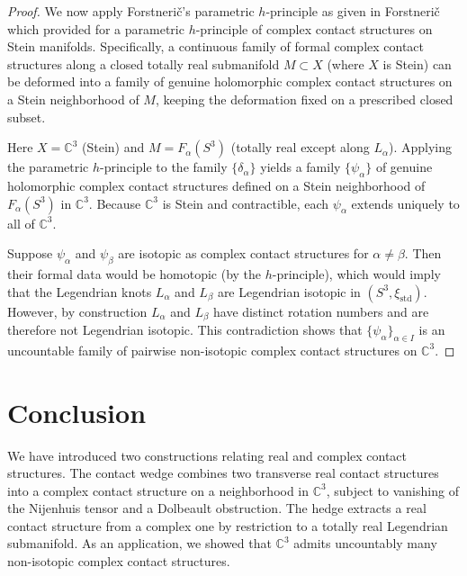 \documentclass{amsart}
\newcommand{\C}{\mathbb{C}}
\begin{document}
\begin{proof}
\medskip
We now apply Forstnerič's parametric $h$-principle as given in Forstnerič \cite{Forstneric2020} which provided for a parametric $h$-principle of complex contact structures on Stein manifolds. 
Specifically, a continuous family of formal complex contact structures along a closed totally real submanifold $M\subset X$ 
(where $X$ is Stein) can be deformed into a family of genuine holomorphic complex contact structures on a Stein neighborhood of $M$, 
keeping the deformation fixed on a prescribed closed subset.

Here $X=\mathbb{C}^3$ (Stein) and $M = F_\alpha(S^3)$ (totally real except along $L_\alpha$). 
Applying the parametric $h$-principle to the family $\{\delta_\alpha\}$ yields a family $\{\psi_\alpha\}$ of genuine holomorphic complex contact structures 
defined on a Stein neighborhood of $F_\alpha(S^3)$ in $\mathbb{C}^3$. 
Because $\mathbb{C}^3$ is Stein and contractible, each $\psi_\alpha$ extends uniquely to all of $\mathbb{C}^3$.

\medskip
Suppose $\psi_\alpha$ and $\psi_\beta$ are isotopic as complex contact structures for $\alpha\neq\beta$. 
Then their formal data would be homotopic (by the $h$-principle), which would imply that the Legendrian knots $L_\alpha$ and $L_\beta$ 
are Legendrian isotopic in $(S^3,\xi_{\mathrm{std}})$. 
However, by construction $L_\alpha$ and $L_\beta$ have distinct rotation numbers and are therefore not Legendrian isotopic. 
This contradiction shows that $\{\psi_\alpha\}_{\alpha\in I}$ is an uncountable family of pairwise non-isotopic complex contact structures on $\mathbb{C}^3$.
\end{proof}


\section{Conclusion}

We have introduced two constructions relating real and complex contact structures. The contact wedge combines two transverse real contact structures into a complex contact structure on a neighborhood in $\C^3$, subject to vanishing of the Nijenhuis tensor and a Dolbeault obstruction. The hedge extracts a real contact structure from a complex one by restriction to a totally real Legendrian submanifold. As an application, we showed that $\C^3$ admits uncountably many non-isotopic complex contact structures.

\newpage
\end{document}
